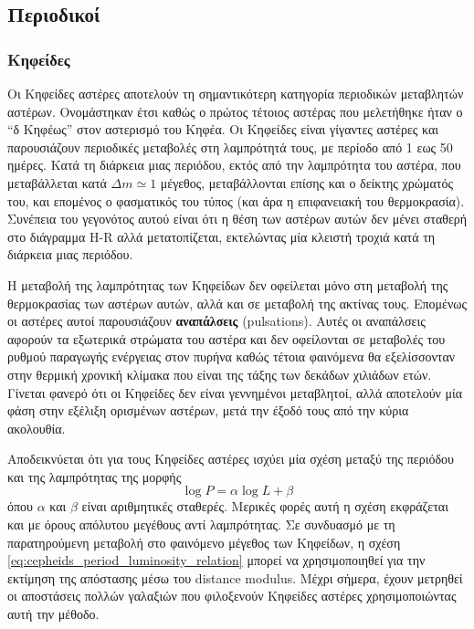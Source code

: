\subsection{Περιοδικοί}
\subsubsection{Κηφείδες}
Οι Κηφείδες αστέρες αποτελούν τη σημαντικότερη κατηγορία περιοδικών μεταβλητών αστέρων. Ονομάστηκαν έτσι καθώς ο πρώτος τέτοιος αστέρας που μελετήθηκε ήταν ο ``δ Κηφέως'' στον αστερισμό του Κηφέα. Οι Κηφείδες είναι γίγαντες αστέρες και παρουσιάζουν περιοδικές μεταβολές στη λαμπρότητά τους, με περίοδο από 1 εως 50 ημέρες. Κατά τη διάρκεια μιας περιόδου, εκτός από την λαμπρότητα του αστέρα, που μεταβάλλεται κατά $\Delta m \simeq 1$ μέγεθος, μεταβάλλονται επίσης και ο δείκτης χρώματός του, και επομένος ο φασματικός του τύπος (και άρα η επιφανειακή του θερμοκρασία). Συνέπεια του γεγονότος αυτού είναι ότι η θέση των αστέρων αυτών δεν μένει σταθερή στο διάγραμμα H-R αλλά μετατοπίζεται, εκτελώντας μία κλειστή τροχιά κατά τη διάρκεια μιας περιόδου.

Η μεταβολή της λαμπρότητας των Κηφείδων δεν οφείλεται μόνο στη μεταβολή της θερμοκρασίας των αστέρων αυτών, αλλά και σε μεταβολή της ακτίνας τους. Επομένως οι αστέρες αυτοί παρουσιάζουν \textbf{αναπάλσεις} (pulsations). Αυτές οι αναπάλσεις αφορούν τα εξωτερικά στρώματα του αστέρα και δεν οφείλονται σε μεταβολές του ρυθμού παραγωγής ενέργειας στον πυρήνα καθώς τέτοια φαινόμενα θα εξελίσσονταν στην θερμική χρονική κλίμακα που είναι της τάξης των δεκάδων χιλιάδων ετών. Γίνεται φανερό ότι οι Κηφείδες δεν είναι γεννημένοι μεταβλητοί, αλλά αποτελούν μία φάση στην εξέλιξη ορισμένων αστέρων, μετά την έξοδό τους από την κύρια ακολουθία.

Αποδεικνύεται ότι για τους Κηφείδες αστέρες ισχύει μία σχέση μεταξύ της περιόδου και της λαμπρότητας της μορφής
\begin{equation}
    \label{eq:cepheids_period_luminosity_relation}
    \log P = \alpha \log L + \beta 
\end{equation}
όπου $\alpha$ και $\beta$ είναι αριθμητικές σταθερές. Μερικές φορές αυτή η σχέση εκφράζεται και με όρους απόλυτου μεγέθους αντί λαμπρότητας. Σε συνδυασμό με τη παρατηρούμενη μεταβολή στο φαινόμενο μέγεθος των Κηφείδων, η σχέση \eqref{eq:cepheids_period_luminosity_relation} μπορεί να χρησιμοποιηθεί για την εκτίμηση της απόστασης μέσω του distance modulus. Μέχρι σήμερα, έχουν μετρηθεί οι αποστάσεις πολλών γαλαξιών που φιλοξενούν Κηφείδες αστέρες χρησιμοποιώντας αυτή την μέθοδο.


